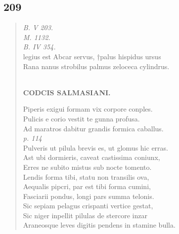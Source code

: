 \documentclass[11pt, a4paper]{report}
\begin{document}
            \subsection*{209}
      \begin{verse}
      \textit{B. V 203.} \\ \textit{M. 1132.} \\ \textit{B. IV 354.} \\ legius est Abcar servus, †palus hispidus ursus \\ Rana nanus strobilus palmus zeloceca cylindrus. \\ 
        ﻿\pagebreak 
    \begin{center} \textbf{CODCIS SALMASIANI.} \end{center} \marginpar{[179]} Piperis exigui formam vix corpore conples. \\ Pulicis e corio vestit te gunna profusa. \\ Ad maratros dabitur grandis formica caballus. \\ \textit{p. 114} \\ Pulveris ut pilula brevis es, ut glomus hic erras. \\ Ast ubi dormieris, caveat castissima coniunx, \\ Erres ne subito mistus sub nocte tomento. \\ Lendis forma tibi, statu non transilis ova, \\ Aequalis pipcri, par est tibi forma cumini, \\ Fasciarii pondus, longi pars summa telonis. \\ Sic sepiam pelagus crispanti vertice gestat, \\ Sic niger inpellit pilulas de stercore inzar \\ Araneosque leves digitis pendens in stamine bulla. \\ 
      \end{verse}
  
\end{document}
